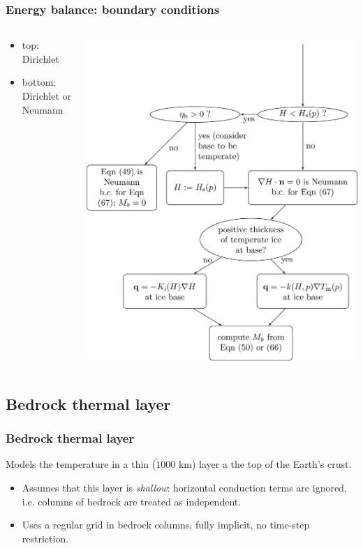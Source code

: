 \documentclass[hide notes,intlimits]{beamer}
\begin{document}
\begin{frame}
  \frametitle{Energy balance: boundary conditions}

  \begin{columns}[c]
    \begin{column}{0.5\linewidth}
      \begin{itemize}
      \item top: Dirichlet
      \item bottom: Dirichlet or Neumann
      \end{itemize}
    \end{column}

    \begin{column}{0.5\linewidth}
      \includegraphics[width=0.9\linewidth]{enthalpy-basal-bc}
    \end{column}
  \end{columns}
\end{frame}

\subsection{Bedrock thermal layer}
\label{sec:bedrock}

\begin{frame}
  \frametitle{Bedrock thermal layer}
  Models the temperature in a thin ($\tilde 1000$ km) layer a the top
  of the Earth's crust.

  \begin{itemize}
  \item Assumes that this layer is \emph{shallow}: horizontal
    conduction terms are ignored, i.e. columns of bedrock are treated
    as independent.
  \item Uses a regular grid in bedrock columns, fully implicit, no
    time-step restriction.
  \end{itemize}
\end{frame}
\end{document}
